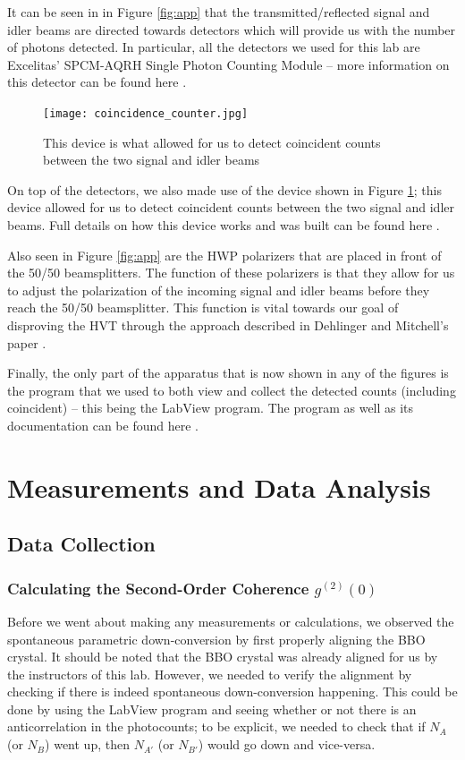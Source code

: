 \documentclass[twocolumn,amsmath,amssymb,pra]{revtex4-2}
\begin{document}
It can be seen in in Figure \ref{fig:app} that the transmitted/reflected signal and idler beams are directed towards detectors which will provide us with the number of photons detected. In particular, all the detectors we used for this lab are Excelitas' SPCM-AQRH Single Photon Counting Module -- more information on this detector can be found here \cite{photon_counting}. 

\begin{figure}[H]
    \centering
    \texttt{[image: coincidence\_counter.jpg]}
    \caption{This device is what allowed for us to detect coincident counts between the two signal and idler beams}
    \label{fig:coincidence counter}
\end{figure}

On top of the detectors, we also made use of the device shown in Figure \ref{fig:coincidence counter}; this device allowed for us to detect coincident counts between the two signal and idler beams. Full details on how this device works and was built can be found here \cite{coincident_counter}. 

Also seen in Figure \ref{fig:app} are the HWP polarizers that are placed in front of the 50/50 beamsplitters. The function of these polarizers is that they allow for us to adjust the polarization of the incoming signal and idler beams before they reach the 50/50 beamsplitter. This function is vital towards our goal of disproving the HVT through the approach described in Dehlinger and Mitchell's paper \cite{D_M}.

Finally, the only part of the apparatus that is now shown in any of the figures is the program that we used to both view and collect the detected counts (including coincident) -- this being the LabView program. The program as well as its documentation can be found here \cite{labview}.

\section{Measurements and Data Analysis}

\subsection{Data Collection}
\subsubsection{Calculating the Second-Order Coherence $g^{(2)}(0)$}
Before we went about making any measurements or calculations, we observed the spontaneous parametric down-conversion by first properly aligning the BBO crystal. It should be noted that the BBO crystal was already aligned for us by the instructors of this lab. However, we needed to verify the alignment by checking if there is indeed spontaneous down-conversion happening. This could be done by using the LabView program and seeing whether or not there is an anticorrelation in the photocounts; to be explicit, we needed to check that if $N_{A}$ (or $N_{B}$) went up, then $N_{A'}$ (or $N_{B'}$) would go down and vice-versa. 
\end{document}
